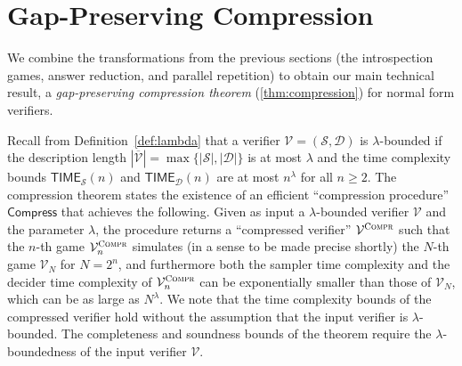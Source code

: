 \documentclass[11pt]{article}
\theoremstyle{definition}
\newcommand{\abs}[1]{\left\vert {#1} \right\vert}
\newcommand{\sampler}{\mathcal{S}}
\newcommand{\decider}{\mathcal{D}}
\newcommand{\verifier}{\mathcal{V}}
\newcommand{\compr}{\textsc{Compr}}
\newcommand{\TIME}{\mathsf{TIME}}
\newcommand{\tmstyle}[1]{\ensuremath{\mathsf{#1}}}
\newcommand{\Compress}{\tmstyle{Compress}}
\begin{document}
 
\section{Gap-Preserving Compression}
\label{sec:compression}

We combine the transformations from the previous sections (the introspection
games, answer reduction, and parallel repetition) to obtain our
main technical result, a \emph{gap-preserving compression theorem}
(\cref{thm:compression}) for normal form verifiers.

Recall from Definition~\ref{def:lambda} that a verifier $\verifier = (\sampler,
\decider)$ is $\lambda$-bounded if the description length $\abs{\overline{\verifier}}= \max \{ |\sampler|,|\decider| \}$ is at most
$\lambda$ and the time complexity bounds $\TIME_\sampler(n)$ and
$\TIME_\decider(n)$ are at most $n^\lambda$ for all $n \ge 2$.
The compression theorem states the existence of an efficient ``compression
procedure'' $\Compress$ that achieves the following.
Given as input a $\lambda$-bounded verifier $\verifier$ and the parameter
$\lambda$, the procedure returns a ``compressed verifier'' $\verifier^\compr$
such that the $n$-th game $\verifier^\compr_n$ simulates (in a sense to be made precise shortly) the $N$-th game
$\verifier_N$ for $N = 2^n$, and furthermore both the sampler time complexity
and the decider time complexity of $\verifier^\compr_n$ can be exponentially
smaller than those of $\verifier_N$, which can be as large as $N^\lambda$.
We note that the time complexity bounds of the compressed verifier hold without
the assumption that the input verifier is $\lambda$-bounded.
The completeness and soundness bounds of the theorem require the
$\lambda$-boundedness of the input verifier $\verifier$.
\end{document}
